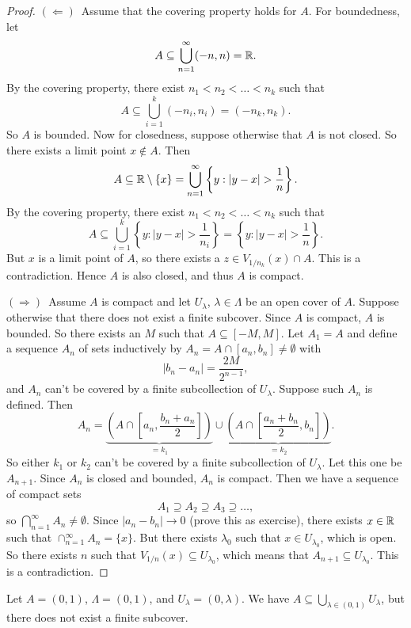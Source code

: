 \begin{proof}
  $(\Leftarrow)$\, Assume that the covering property holds for
  $A$. For boundedness, let
  \[A \subseteq \bigcup_{n = 1}^\infty (-n, n) = \mathbb{R}.\]
  By the covering property, there exist
  $n_1 < n_2 < \dots < n_k$ such that
  \[A \subseteq \bigcup_{i = 1}^k (-n_i, n_i) = (-n_k, n_k).\]
  So $A$ is bounded. Now for closedness, suppose otherwise
  that $A$ is not closed. So there exists a limit point
  $x \notin A$. Then
  \[A \subseteq \mathbb{R} \setminus \{x\} = \bigcup_{n = 1}^\infty \left\{y : |y - x| > \frac{1}{n}\right\}.\]
  By the covering property, there exist
  $n_1 < n_2 < \dots < n_k$ such that
  \[A \subseteq \bigcup_{i = 1}^k \left\{y : |y - x| > \frac{1}{n_i}\right\} = \left\{y : |y - x| > \frac{1}{n}\right\}.\]
  But $x$ is a limit point of $A$, so there exists a
  $z \in V_{1 / n_k}(x) \cap A$. This is a contradiction.
  Hence $A$ is also closed, and thus $A$ is compact.

  $(\Rightarrow)$\, Assume $A$ is compact and let
  $U_\lambda$, $\lambda \in \Lambda$ be an open cover
  of $A$. Suppose otherwise that there does not
  exist a finite subcover.
  Since $A$ is compact, $A$ is bounded. So there exists
  an $M$ such that $A \subseteq [-M, M]$. Let $A_1 = A$
  and define a sequence $A_n$ of sets inductively by
  $A_n = A \cap [a_n, b_n] \ne \emptyset$ with
  \[
    |b_n - a_n| = \frac{2M}{2^{n - 1}}
  ,\]
  and $A_n$ can't be covered by a finite subcollection
  of $U_\lambda$. Suppose such $A_n$ is defined.
  Then
  \[A_n = \underbrace{\left(A \cap \left[a_n, \frac{b_n + a_n}{2}\right]\right)}_{= k_1} \cup \underbrace{\left(A \cap \left[\frac{a_n + b_n}{2}, b_n\right]\right)}_{= k_2}.\]
  So either $k_1$ or $k_2$ can't be covered by a finite
  subcollection of $U_\lambda$. Let this one be $A_{n + 1}$.
  Since $A_n$ is closed and bounded, $A_n$ is compact.
  Then we have a sequence of compact sets
  \[A_1 \supseteq A_2 \supseteq A_3 \supseteq \dots,\]
  so $\bigcap_{n = 1}^\infty A_n \ne \emptyset$.
  Since $|a_n - b_n| \to 0$ (prove this as exercise),
  there exists $x \in \mathbb{R}$ such that
  $\cap_{n = 1}^\infty A_n = \{x\}$. But there exists
  $\lambda_0$ such that $x \in U_{\lambda_0}$, which is open.
  So there exists $n$ such that
  $V_{1 / n}(x) \subseteq U_{\lambda_0}$, which means that
  $A_{n + 1} \subseteq U_{\lambda_0}$. This is a
  contradiction.
\end{proof}

\begin{example}
  Let $A = (0, 1)$, $\Lambda = (0, 1)$, and
  $U_\lambda = (0, \lambda)$. We have
  $A \subseteq \bigcup_{\lambda \in (0, 1)} U_\lambda$,
  but there does not exist a finite subcover.
\end{example}
